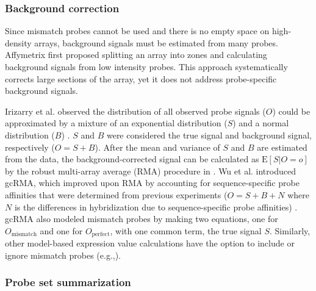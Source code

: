 \subsubsection{Background correction}

Since mismatch probes cannot be used and there is no 
empty space on high-density arrays, 
background signals must be estimated from many
probes. Affymetrix first proposed splitting an array
into zones and calculating background signals from low
intensity probes. This approach systematically corrects large
sections of the array,
yet it does not address probe-specific background signals.

Irizarry et al. observed the distribution
of all observed probe signals ($O$) could be approximated by
a mixture of an exponential distribution ($S$) and a
normal distribution ($B$) \cite{Irizarry:2003ge}.
$S$ and $B$ were considered the true signal and background signal, respectively ($O=S+B$).
After the mean and variance of $S$ and $B$ are estimated from the data, 
the background-corrected signal can be calculated 
as $\text{E}[S|O=o]$ by the robust multi-array average (RMA) procedure in
\cite{Irizarry:2003ge}. 
Wu et al. introduced gcRMA, which improved upon RMA by 
accounting for sequence-specific probe
affinities that were determined from previous experiments
($O=S+B+N$ where $N$ is the differences in hybridization due to
sequence-specific probe affinities) \cite{Wu:2004wh}. gcRMA
also modeled mismatch probes by making two equations, one for 
$O_{\text{mismatch}}$ and one for $O_{\text{perfect}}$, with one common 
term, the true signal $S$. 
Similarly, other model-based expression value calculations
have the option to include or ignore
mismatch probes (e.g.,\cite{Li:2001jv,Milo:2003tt}).

\subsubsection{Probe set summarization}

